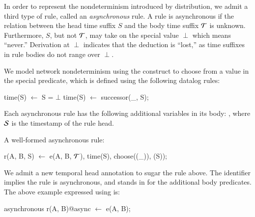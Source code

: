 
In order to represent the nondeterminism introduced by distribution, we admit a
third type of rule, called an {\em asynchronous} rule.  A rule is asynchronous
if the 
relation between the head time suffix $S$ and the body time suffix $\Tau$ is
unknown.  Furthermore, $S$, but not $\Tau$, may take on the special value
$\perp$ which means ``never.''  Derivation at $\perp$ indicates that the
deduction is ``lost,'' as time suffixes in rule bodies do not range over
$\perp$.

We model network nondeterminism using the  construct to choose
from a value in the special 
predicate, which is defined using the following datalog rules:

\begin{Dedalus}
time(S) \(\leftarrow\) S = \(\bot\)
time(S) \(\leftarrow\) successor(_, S);
\end{Dedalus}


Each asynchronous rule has the following additional variables in its
body: , where
$\SDedalus$ is the timestamp of the rule head.

\begin{example}
A well-formed asynchronous \lang rule:

\begin{Dedalus}
r(A, B, S) \(\leftarrow\) 
  e(A, B, \(\Tau\)),
  time(S), choose((_)), (S));
\end{Dedalus}
\end{example}

We admit a new temporal head annotation to sugar the rule above.  The
identifier  implies the rule is asynchronous, and stands in for the additional body predicates.
The above example expressed using  is:

\begin{Dedalus}
asynchronous
r(A, B)@async \(\leftarrow\) e(A, B);
\end{Dedalus}

